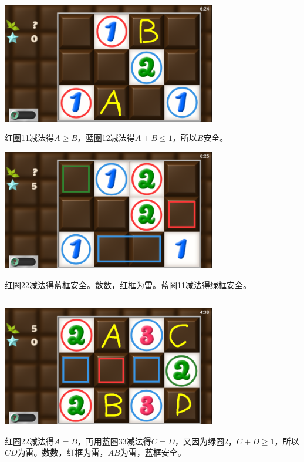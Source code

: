 \subsection{} %
\begin{center}
    \includegraphics[width=0.7\textwidth]{puzzle/69-1.png}
\end{center}
红圈11减法得$A\ge B$，蓝圈12减法得$A+B\le 1$，所以$B$安全。
\begin{center}
    \includegraphics[width=0.7\textwidth]{puzzle/69-2.png}
\end{center}
红圈22减法得蓝框安全。数数，红框为雷。蓝圈11减法得绿框安全。

\subsection{} %
\begin{center}
    \includegraphics[width=0.7\textwidth]{puzzle/70-1.png}
\end{center}
红圈22减法得$A=B$，再用蓝圈33减法得$C=D$，又因为绿圈2，$C+D\ge 1$，所以$CD$为雷。数数，红框为雷，$AB$为雷，蓝框安全。

